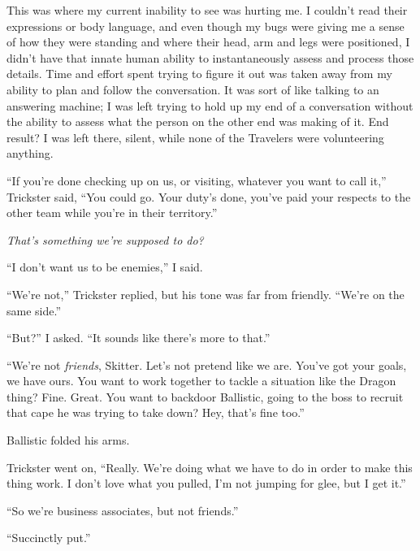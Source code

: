 This was where my current inability to see was hurting me.  I couldn't read their expressions or body language, and even though my bugs were giving me a sense of how they were standing and where their head, arm and legs were positioned, I didn't have that innate human ability to instantaneously assess and process those details.  Time and effort spent trying to figure it out was taken away from my ability to plan and follow the conversation.  It was sort of like talking to an answering machine; I was left trying to hold up my end of a conversation without the ability to assess what the person on the other end was making of it.  End result?  I was left there, silent, while none of the Travelers were volunteering anything.



``If you're done checking up on us, or visiting, whatever you want to call it,'' Trickster said, ``You could go.  Your duty's done, you've paid your respects to the other team while you're in their territory.''



\emph{That's something we're supposed to do?}



``I don't want us to be enemies,'' I said.



``We're not,'' Trickster replied, but his tone was far from friendly.  ``We're on the same side.''



``But?'' I asked.  ``It sounds like there's more to that.''



``We're not \emph{friends}, Skitter.  Let's not pretend like we are.  You've got your goals, we have ours.  You want to work together to tackle a situation like the Dragon thing?  Fine.  Great.  You want to backdoor Ballistic, going to the boss to recruit that cape he was trying to take down?  Hey, that's fine too.''



Ballistic folded his arms.



Trickster went on, ``Really.  We're doing what we have to do in order to make this thing work.  I don't love what you pulled, I'm not jumping for glee, but I get it.''



``So we're business associates, but not friends.''



``Succinctly put.''



